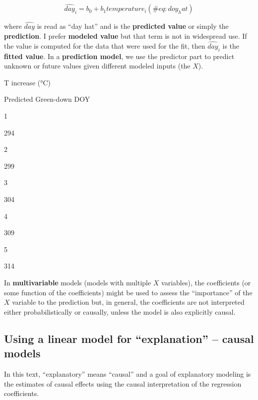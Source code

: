 \documentclass[]{book}
\begin{document}
\begin{equation}
\widehat{day}_i = b_0 + b_1 temperature_i
(\#eq:doy_hat)
\end{equation}

where \(\widehat{day}\) is read as ``day hat'' and is the \textbf{predicted value} or simply the \textbf{prediction}. I prefer \textbf{modeled value} but that term is not in widespread use. If the value is computed for the data that were used for the fit, then \(\widehat{day}_i\) is the \textbf{fitted value}. In a \textbf{prediction model}, we use the predictor part to predict unknown or future values given different modeled inputs (the \(X\)).

T increase (°C)

Predicted Green-down DOY

1

294

2

299

3

304

4

309

5

314

In \textbf{multivariable} models (models with multiple \(X\) variables), the coefficients (or some function of the coefficients) might be used to assess the ``importance'' of the \(X\) variable to the prediction but, in general, the coefficients are not interpreted either probabilistically or causally, unless the model is also explicitly causal.

\hypertarget{using-a-linear-model-for-explanation-causal-models}{%
\subsection{Using a linear model for ``explanation'' -- causal models}\label{using-a-linear-model-for-explanation-causal-models}}

In this text, ``explanatory'' means ``causal'' and a goal of explanatory modeling is the estimates of causal effects using the causal interpretation of the regression coefficients.
\end{document}
